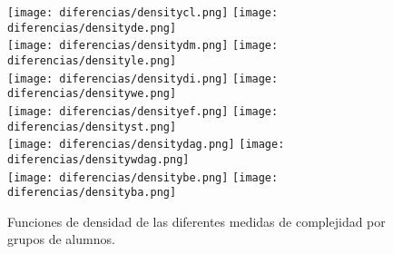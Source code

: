 \begin{figure}[H]
\centering
\texttt{[image: diferencias/densitycl.png]}
\texttt{[image: diferencias/densityde.png]} \\
\texttt{[image: diferencias/densitydm.png]}
\texttt{[image: diferencias/densityle.png]} \\
\texttt{[image: diferencias/densitydi.png]}
\texttt{[image: diferencias/densitywe.png]} \\
\texttt{[image: diferencias/densityef.png]}
\texttt{[image: diferencias/densityst.png]} \\
\texttt{[image: diferencias/densitydag.png]}
\texttt{[image: diferencias/densitywdag.png]} \\
\texttt{[image: diferencias/densitybe.png]}
\texttt{[image: diferencias/densityba.png]}
\caption{Funciones de densidad de las diferentes medidas de complejidad por grupos de alumnos.}
\label{fig:tstudentcomplexitydensity}
\end{figure}